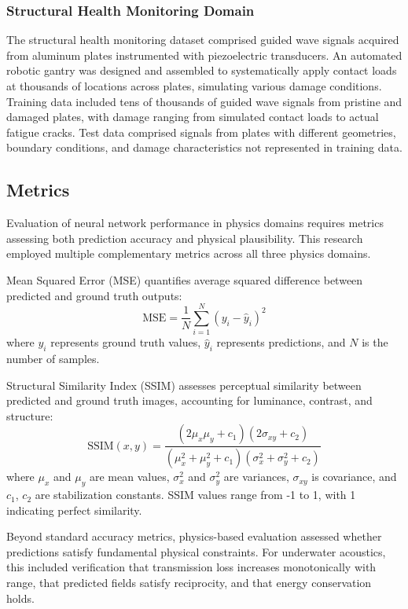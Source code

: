 \documentclass{article}
\begin{document}
\subsubsection{Structural Health Monitoring Domain}

The structural health monitoring dataset comprised guided wave signals acquired from aluminum plates instrumented with piezoelectric transducers. An automated robotic gantry was designed and assembled to systematically apply contact loads at thousands of locations across plates, simulating various damage conditions. Training data included tens of thousands of guided wave signals from pristine and damaged plates, with damage ranging from simulated contact loads to actual fatigue cracks. Test data comprised signals from plates with different geometries, boundary conditions, and damage characteristics not represented in training data.

\subsection{Metrics}

Evaluation of neural network performance in physics domains requires metrics assessing both prediction accuracy and physical plausibility. This research employed multiple complementary metrics across all three physics domains.

Mean Squared Error (MSE) quantifies average squared difference between predicted and ground truth outputs:
\begin{equation}
\text{MSE} = \frac{1}{N}\sum_{i=1}^{N}(y_i - \hat{y}_i)^2
\end{equation}
where $y_i$ represents ground truth values, $\hat{y}_i$ represents predictions, and $N$ is the number of samples.

Structural Similarity Index (SSIM) assesses perceptual similarity between predicted and ground truth images, accounting for luminance, contrast, and structure:
\begin{equation}
\text{SSIM}(x,y) = \frac{(2\mu_x\mu_y + c_1)(2\sigma_{xy} + c_2)}{(\mu_x^2 + \mu_y^2 + c_1)(\sigma_x^2 + \sigma_y^2 + c_2)}
\end{equation}
where $\mu_x$ and $\mu_y$ are mean values, $\sigma_x^2$ and $\sigma_y^2$ are variances, $\sigma_{xy}$ is covariance, and $c_1$, $c_2$ are stabilization constants. SSIM values range from -1 to 1, with 1 indicating perfect similarity.

Beyond standard accuracy metrics, physics-based evaluation assessed whether predictions satisfy fundamental physical constraints. For underwater acoustics, this included verification that transmission loss increases monotonically with range, that predicted fields satisfy reciprocity, and that energy conservation holds.
\end{document}
